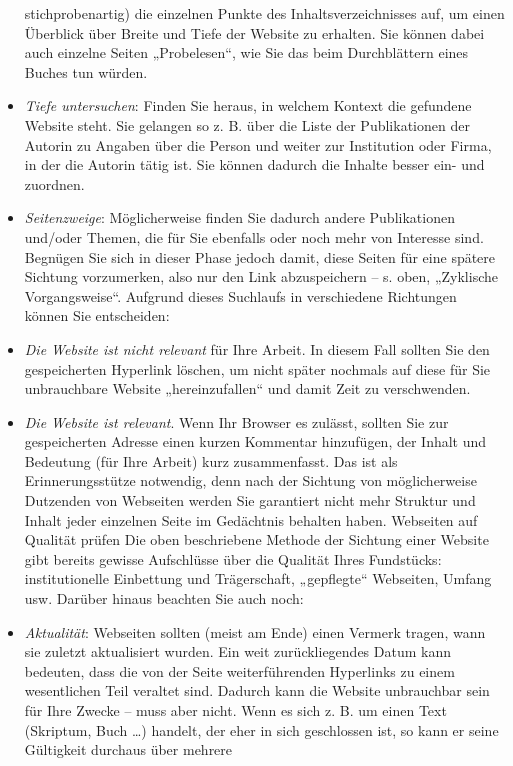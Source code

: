 \documentclass[]{book}
\theoremstyle{definition}
\theoremstyle{definition}
\theoremstyle{definition}
\theoremstyle{remark}
\begin{document}
\begin{itemize}
  stichprobenartig) die einzelnen Punkte des Inhaltsverzeichnisses auf,
  um einen Überblick über Breite und Tiefe der Website zu erhalten. Sie
  können dabei auch einzelne Seiten „Probelesen``, wie Sie das beim
  Durchblättern eines Buches tun würden.
\item
  \emph{Tiefe untersuchen}: Finden Sie heraus, in welchem Kontext die
  gefundene Website steht. Sie gelangen so z. B. über die Liste der
  Publikationen der Autorin zu Angaben über die Person und weiter zur
  Institution oder Firma, in der die Autorin tätig ist. Sie können
  dadurch die Inhalte besser ein- und zuordnen.
\item
  \emph{Seitenzweige}: Möglicherweise finden Sie dadurch andere
  Publikationen und/oder Themen, die für Sie ebenfalls oder noch mehr
  von Interesse sind. Begnügen Sie sich in dieser Phase jedoch damit,
  diese Seiten für eine spätere Sichtung vorzumerken, also nur den Link
  abzuspeichern -- s. oben, „Zyklische Vorgangsweise``. Aufgrund dieses
  Suchlaufs in verschiedene Richtungen können Sie entscheiden:
\item
  \emph{Die Website ist nicht relevant} für Ihre Arbeit. In diesem Fall
  sollten Sie den gespeicherten Hyperlink löschen, um nicht später
  nochmals auf diese für Sie unbrauchbare Website „hereinzufallen`` und
  damit Zeit zu verschwenden.
\item
  \emph{Die Website ist relevant}. Wenn Ihr Browser es zulässt, sollten
  Sie zur gespeicherten Adresse einen kurzen Kommentar hinzufügen, der
  Inhalt und Bedeutung (für Ihre Arbeit) kurz zusammenfasst. Das ist als
  Erinnerungsstütze notwendig, denn nach der Sichtung von möglicherweise
  Dutzenden von Webseiten werden Sie garantiert nicht mehr Struktur und
  Inhalt jeder einzelnen Seite im Gedächtnis behalten haben. Webseiten
  auf Qualität prüfen Die oben beschriebene Methode der Sichtung einer
  Website gibt bereits gewisse Aufschlüsse über die Qualität Ihres
  Fundstücks: institutionelle Einbettung und Trägerschaft, „gepflegte``
  Webseiten, Umfang usw. Darüber hinaus beachten Sie auch noch:
\item
  \emph{Aktualität}: Webseiten sollten (meist am Ende) einen Vermerk
  tragen, wann sie zuletzt aktualisiert wurden. Ein weit zurückliegendes
  Datum kann bedeuten, dass die von der Seite weiterführenden Hyperlinks
  zu einem wesentlichen Teil veraltet sind. Dadurch kann die Website
  unbrauchbar sein für Ihre Zwecke -- muss aber nicht. Wenn es sich z.
  B. um einen Text (Skriptum, Buch \ldots{}) handelt, der eher in sich
  geschlossen ist, so kann er seine Gültigkeit durchaus über mehrere

\end{itemize}
\end{document}
